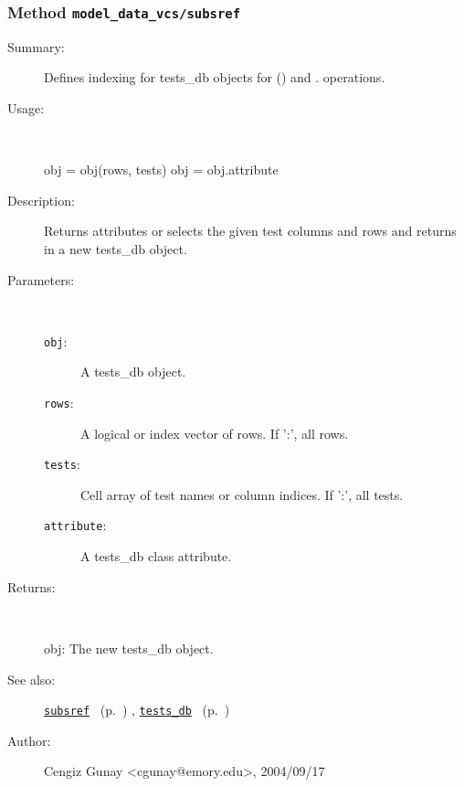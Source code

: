 \subsubsection[Method \texttt{subsref}]{Method \texttt{model\_data\_vcs/subsref}}%
%
\label{ref_model_data_vcs__subsref}%
\hypertarget{ref_model_data_vcs__subsref}{}%
\begin{description}
\item[Summary:]Defines indexing for tests\_db objects for () and . operations. 
%
\item[Usage:]~%
\begin{lyxcode}%
obj = obj(rows, tests)
 obj = obj.attribute
%
\end{lyxcode}%
%
\item[Description:]%
Returns attributes or selects the given test columns and rows
 and returns in a new tests\_db object.
\item[Parameters:]~
\begin{description}%
\item[\texttt{obj}:]
 A tests\_db object.
\item[\texttt{rows}:]
 A logical or index vector of rows. If ':', all rows.
\item[\texttt{tests}:]
 Cell array of test names or column indices. If ':', all tests.
\item[\texttt{attribute}:]
 A tests\_db class attribute.
\end{description}%
%
\item[Returns:
]~

	obj: The new tests\_db object.
%
%
\item[See also:]%
\hyperlink{ref_subsref}{\texttt{subsref}}%
\ (p.~\pageref{ref_subsref})%
%
, \hyperlink{ref_tests_db}{\texttt{tests\_db}}%
\ (p.~\pageref{ref_tests_db})%
%
%
\item[Author:]%
Cengiz Gunay <cgunay@emory.edu>, 2004/09/17
%
\end{description}
\methodline%

